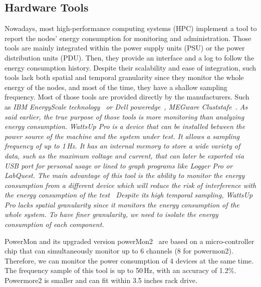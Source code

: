\subsection{Hardware Tools}
Nowadays, most high-performance computing systems (HPC) implement a tool to report the nodes' energy consumption for monitoring and administration.
Those tools are mainly integrated within the power supply units (PSU) or the power distribution units (PDU).
Then, they provide an interface and a log to follow the energy consumption history.
Despite their scalability and ease of integration, such tools lack both spatial and temporal granularity since they monitor the whole energy of the nodes, and most of the time, they have a shallow sampling frequency.
Most of those tools are provided directly by the manufacturers.
Such as \em{IBM EnergyScale technology}~\cite{mccreary2007energyscale,caldeira2014ibm,caldeiraibm} or \em{Dell poweredge}~\cite{lovicott2009thermal}, MEGware Cluststafe~\cite{breitbart2015case}.
As said earlier, the true purpose of those tools is more monitoring than analyzing energy consumption.
WattsUp Pro is a device that can be installed between the power source of the machine and the system under test.
It allows a sampling frequency of up to 1\,Hz. It has an internal memory to store a wide variety of data, such as the maximum voltage and current, that can later be exported via USB port for personal usage or lined to graph programs like Logger Pro or LabQuest.
The main advantage of this tool is the ability to monitor the energy consumption from a different device which will reduce the risk of interference with the energy consumption of the test~\cite{hirst2013watts}
Despite its high temporal sampling, WattsUp Pro lacks spatial granularity since it monitors the energy consumption of the whole system.
To have finer granularity, we need to isolate the energy consumption of each component.



PowerMon and its upgraded version powerMon2~\cite{bedard2010powermon} are based on a micro-controller chip that can simultaneously monitor up to 6 channels (8 for powermon2).
Therefore, we can monitor the power consumption of 4 devices at the same time.
The frequency sample of this tool is up to 50\,Hz, with an accuracy of 1.2\%.
Powermore2 is smaller and can fit within 3.5 inches rack drive.

